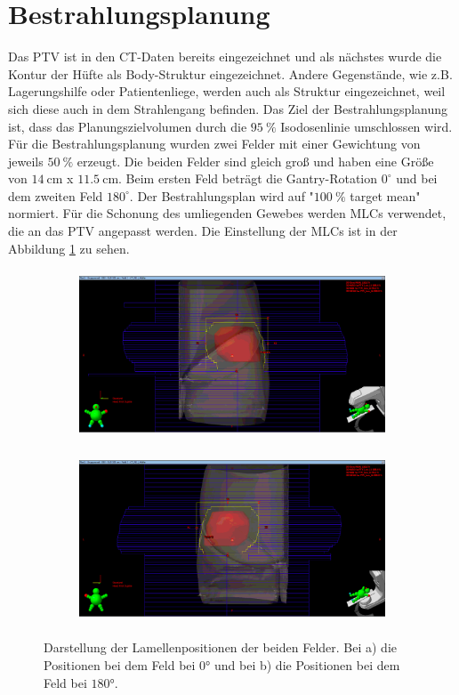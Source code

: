 \section{Bestrahlungsplanung}
\label{sec:Bestrahlungsplanung}

Das PTV ist in den CT-Daten bereits eingezeichnet und als nächstes wurde die Kontur der Hüfte als Body-Struktur eingezeichnet.
Andere Gegenstände, wie z.B. Lagerungshilfe oder Patientenliege, werden auch als Struktur eingezeichnet, weil sich diese auch in dem Strahlengang befinden.
Das Ziel der Bestrahlungsplanung ist, dass das Planungszielvolumen durch die $\SI{95}{\percent}$ Isodosenlinie umschlossen wird.
Für die Bestrahlungsplanung wurden zwei Felder mit einer Gewichtung von jeweils $\SI{50}{\percent}$ erzeugt.
Die beiden Felder sind gleich groß und haben eine Größe
von  $\SI{14}{\centi\meter}$ x $\SI{11.5}{\centi\meter}$. Beim ersten Feld beträgt die Gantry-Rotation $0^\circ$ und bei dem zweiten Feld $180^\circ$.
Der Bestrahlungsplan wird auf "$\SI{100}{\percent}$ target mean" normiert.
Für die Schonung des umliegenden Gewebes werden MLCs verwendet, die an das PTV angepasst werden.
Die Einstellung der MLCs ist in der Abbildung \ref{abb:MLC} zu sehen.


\begin{figure}[H]
  \centering
  \begin{subfigure}{\textwidth}
    \centering
    \includegraphics[height = 5cm]{Bilder/MLC_Hüfte1.png}
    \caption{}
  \end{subfigure}
  \begin{subfigure}{\textwidth}
    \centering
    \includegraphics[height=5cm]{Bilder/MLC_Hüfte2.png}
    \caption{}
  \end{subfigure}
  \caption{Darstellung der Lamellenpositionen der beiden Felder. Bei a) die Positionen bei dem Feld bei $0°$ und bei b) die Positionen bei dem Feld bei $180°$.}
  \label{abb:MLC}
\end{figure}
